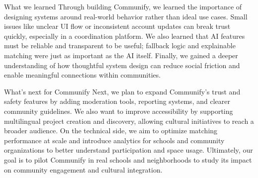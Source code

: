 What we learned
Through building Communify, we learned the importance of designing systems around real-world behavior rather than ideal use cases. Small issues like unclear UI flow or inconsistent account updates can break trust quickly, especially in a coordination platform. We also learned that AI features must be reliable and transparent to be useful; fallback logic and explainable matching were just as important as the AI itself. Finally, we gained a deeper understanding of how thoughtful system design can reduce social friction and enable meaningful connections within communities.

What's next for Communify
Next, we plan to expand Communify’s trust and safety features by adding moderation tools, reporting systems, and clearer community guidelines. We also want to improve accessibility by supporting multilingual project creation and discovery, allowing cultural initiatives to reach a broader audience. On the technical side, we aim to optimize matching performance at scale and introduce analytics for schools and community organizations to better understand participation and space usage. Ultimately, our goal is to pilot Communify in real schools and neighborhoods to study its impact on community engagement and cultural integration.
